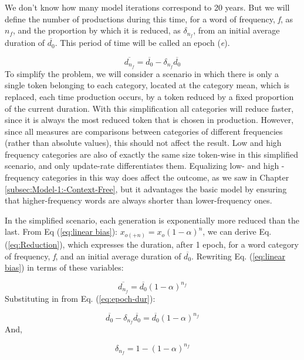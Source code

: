We don't know how many model iterations correspond to 20 years. But
we will define the number of productions during this time, for a word
of frequency, \emph{f}, as $n_{f}$, and the proportion by which it
is reduced, as $\delta_{n_{f}}$, from an initial average duration
of $\overline{d_{0}}$. This period of time will be called an epoch
(\emph{e}). 

\begin{equation}
\overline{d_{n_{f}}}=\overline{d_{0}}-\delta_{n_{f}}\overline{d_{0}}\label{eq:epoch-dur}
\end{equation}
To simplify the problem, we will consider a scenario in which there
is only a single token belonging to each category, located at the
category mean, which is replaced, each time production occurs, by
a token reduced by a fixed proportion of the current duration. With
this simplification all categories will reduce faster, since it is
always the most reduced token that is chosen in production. However,
since all measures are comparisons between categories of different
frequencies (rather than absolute values), this should not affect
the result. Low and high frequency categories are also of exactly
the same size token-wise in this simplified scenario, and only update-rate
differentiates them. Equalizing low- and high -frequency categories
in this way does affect the outcome, as we saw in Chapter \ref{subsec:Model-1:-Context-Free},
but it advantages the basic model by ensuring that higher-frequency
words are always shorter than lower-frequency ones.

In the simplified scenario, each generation is exponentially more
reduced than the last. From Eq (\ref{eq:linear bias}): $x_{o(+n)}=x_{o}\left(1-\alpha\right)^{n}$,
we can derive Eq. (\ref{eq:Reduction}), which expresses the duration,
after 1 epoch, for a word category of frequency, \emph{f}, and an
initial average duration of $\overline{d_{0}}$. Rewriting Eq. (\ref{eq:linear bias})
in terms of these variables:

\begin{equation}
\overline{d_{n_{f}}}=\overline{d_{0}}(1-\alpha)^{n_{f}}
\end{equation}
Substituting in from Eq. (\ref{eq:epoch-dur}):

\begin{equation}
\overline{d_{0}}-\delta_{n_{f}}\overline{d_{0}}=\overline{d_{0}}(1-\alpha)^{n_{f}}
\end{equation}
And, 

\begin{equation}
\delta_{n_{f}}=1-(1-\alpha)^{n_{f}}\label{eq:Reduction}
\end{equation}

